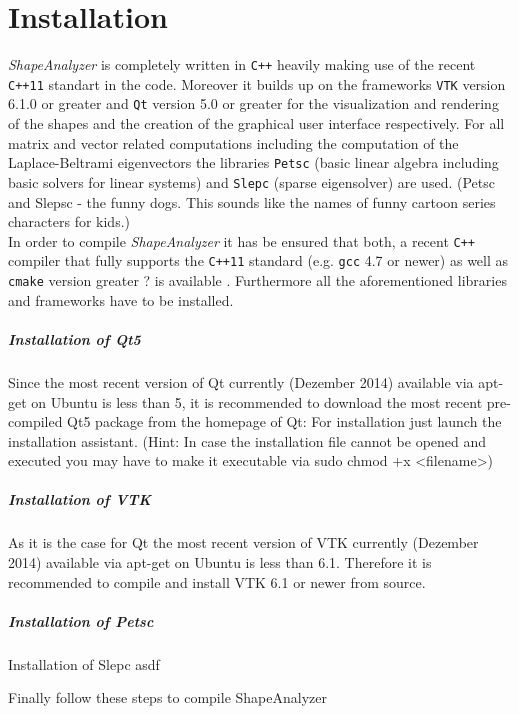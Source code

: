 
\chapter{Installation}

\emph{ShapeAnalyzer} is completely written in \texttt{C++} heavily making use of the recent \texttt{C++11} standart in the code. Moreover it builds up on the frameworks \texttt{VTK} version 6.1.0 or greater and \texttt{Qt} version 5.0 or greater for the visualization and rendering of the shapes and the creation of the graphical user interface respectively. For all matrix and vector related computations including the computation of the Laplace-Beltrami eigenvectors the libraries \texttt{Petsc} (basic linear algebra including basic solvers for linear systems) and \texttt{Slepc} (sparse eigensolver) are used. (Petsc and Slepsc - the funny dogs. This sounds like the names of funny cartoon series characters for kids.)\\
In order to compile \emph{ShapeAnalyzer} it has be ensured that both, a recent \texttt{C++} compiler that fully supports the \texttt{C++11} standard (e.g. \texttt{gcc} 4.7 or newer) as well as \texttt{cmake} version greater ? is available . Furthermore all the aforementioned libraries and frameworks have to be installed.


\paragraph{Installation of Qt5}
Since the most recent version of Qt currently (Dezember 2014) available via apt-get on Ubuntu is less than 5, it is recommended to download the most recent pre-compiled Qt5 package from the homepage of Qt: 
For installation just launch the installation assistant. (Hint: In case the installation file cannot be opened and executed you may have to make it executable via sudo chmod +x <filename>)
\paragraph{Installation of VTK}
As it is the case for Qt the most recent version of VTK currently (Dezember 2014) available via apt-get on Ubuntu is less than 6.1. Therefore it is recommended to compile and install VTK 6.1 or newer from source.

\paragraph{Installation of Petsc}

\begin{paragraph}{Installation of Slepc}
asdf
\end{paragraph}

Finally follow these steps to compile ShapeAnalyzer

